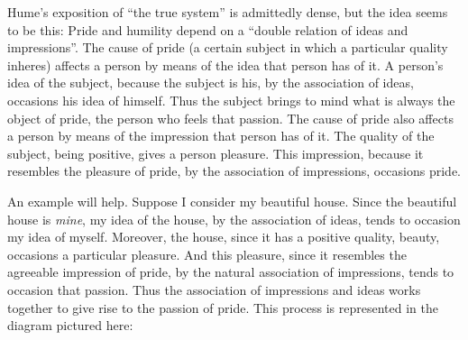 Hume's exposition of ``the true system'' is admittedly dense, but the idea seems to be this: Pride and humility depend on a ``double relation of ideas and impressions''. The cause of pride (a certain subject in which a particular quality inheres) affects a person by means of the idea that person has of it. A person's idea of the subject, because the subject is his, by the association of ideas, occasions his idea of himself. Thus the subject brings to mind what is always the object of pride, the person who feels that passion. The cause of pride also affects a person by means of the impression that person has of it. The quality of the subject, being positive, gives a person pleasure. This impression, because it resembles the pleasure of pride, by the association of impressions, occasions pride. \change

% 


An example will help. Suppose I consider my beautiful house. Since the beautiful house is \emph{mine}, my idea of the house, by the association of ideas, tends to occasion my idea of myself. Moreover, the house, since it has a positive quality, beauty, occasions a particular pleasure. And this pleasure, since it resembles the agreeable impression of pride, by the natural association of impressions, tends to occasion that passion. Thus the association of impressions and ideas works together to give rise to the passion of pride. This process is represented in the diagram pictured here: \change

